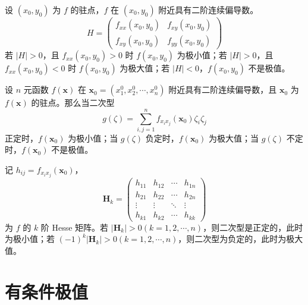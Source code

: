 \documentclass{ctexbook}
\begin{document}
\begin{theorem}[无条件极值充分条件]
    设 $(x_0,y_0)$ 为 $f$ 的驻点，$f$ 在 $(x_0,y_0)$ 附近具有二阶连续偏导数。
    \begin{equation}
        H=\begin{pmatrix}
            f_{xx}(x_0,y_0) & f_{xy}(x_0,y_0) \\
            f_{xy}(x_0,y_0) & f_{yy}(x_0,y_0)
        \end{pmatrix}
    \end{equation}
    若 $|H|>0$，且 $f_{xx}(x_0,y_0)>0$ 时 $f(x_0,y_0)$ 为极小值；若 $|H|>0$，且 $f_{xx}(x_0,y_0)<0$ 时 $f(x_0,y_0)$ 为极大值；若 $|H|<0$，$f(x_0,y_0)$ 不是极值。
\end{theorem}

\begin{theorem}[无条件极值充分条件多元推广]
    设 $n$ 元函数 $f(\boldsymbol{x})$ 在 $\boldsymbol{x}_0=(x_1^0,x_2^0,\cdots,x_n^0)$ 附近具有二阶连续偏导数，且 $\boldsymbol{x}_0$ 为 $f(\boldsymbol{x})$ 的驻点。那么当二次型
    \begin{equation}
        g(\zeta)=\sum_{i,j=1}^n f_{x_ix_j}(\boldsymbol{x}_0)\zeta_i\zeta_j
    \end{equation}
    正定时，$f(\boldsymbol{x}_0)$ 为极小值；当 $g(\zeta)$ 负定时，$f(\boldsymbol{x}_0)$ 为极大值；当 $g(\zeta)$ 不定时，$f(\boldsymbol{x}_0)$ 不是极值。

    记 $h_{ij}=f_{x_ix_j}(\boldsymbol{x}_0)$，
    \begin{equation}
        \boldsymbol{H}_k=\begin{pmatrix}
            h_{11} & h_{12} & \cdots & h_{1n} \\
            h_{21} & h_{22} & \cdots & h_{2n} \\
            \vdots & \vdots & \ddots & \vdots \\
            h_{k1} & h_{k2} & \cdots & h_{kk}
        \end{pmatrix}
    \end{equation}
    为 $f$ 的 $k$ 阶 Hesse 矩阵。若 $|\boldsymbol{H}_k|>0(k=1,2,\cdots,n)$，则二次型是正定的，此时为极小值；若 $(-1)^k|\boldsymbol{H}_k|>0(k=1,2,\cdots,n)$，则二次型为负定的，此时为极大值。
\end{theorem}

\section{有条件极值}
\end{document}
